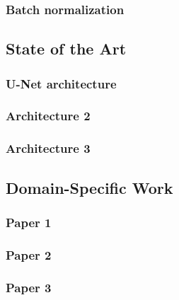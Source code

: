   \subsubsection{Batch normalization}

\subsection{State of the Art}
  \subsubsection{U-Net architecture}
  \subsubsection{Architecture 2}
  \subsubsection{Architecture 3}

\subsection{Domain-Specific Work}
  \subsubsection{Paper 1}
  \subsubsection{Paper 2}
  \subsubsection{Paper 3}
